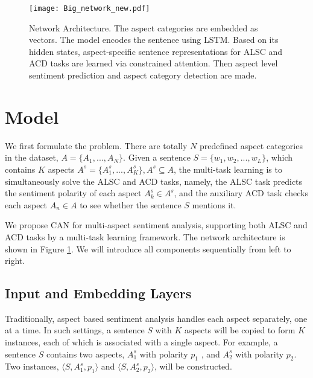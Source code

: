 \documentclass[11pt,a4paper]{article}
\begin{document}

\begin{figure*}
\setlength{\abovecaptionskip}{0.2cm}   %
\setlength{\belowcaptionskip}{-0.3cm}   %
\centering
	\texttt{[image: Big\_network\_new.pdf]}
    \caption{Network Architecture. The aspect categories are embedded as vectors. The model encodes the sentence using LSTM. Based on its hidden states, aspect-specific sentence representations for ALSC and ACD tasks are learned via constrained attention. Then aspect level sentiment prediction and aspect category detection are made. }
    \label{network}
\end{figure*}
\section{Model}
We first formulate the problem. There are totally $N$ predefined aspect categories in the dataset, $A=\{A_1,...,A_N\}$. Given a sentence $S=\{w_1, w_2, ..., w_L\}$, which contains $K$ aspects $A^s=\{A_1^s,...,A_K^s\}, A^s\subseteq  A$, the multi-task learning is to simultaneously solve the ALSC and ACD tasks, namely, the ALSC task predicts the sentiment polarity of each aspect $A_k^s \in A^s$, and the auxiliary ACD task checks each aspect $A_n \in A$ to see whether the sentence $S$ mentions it.

We propose CAN for multi-aspect sentiment analysis, supporting both ALSC and ACD tasks by a multi-task learning framework. The network architecture is shown in Figure \ref{network}. We will introduce all components sequentially from left to right.

\subsection{Input and Embedding Layers}
Traditionally, aspect based sentiment analysis handles each aspect separately, one at a time. In such settings, a sentence $S$ with $K$ aspects will be copied to form $K$ instances, each of which is associated with a single aspect. For example, a sentence $S$ contains two aspects, $A_1^s$ with polarity $p_1$ , and $A_2^s$ with polarity $p_2$. Two instances, $\langle{S, A_1^s, p_1}\rangle$ and $\langle{S, A_2^s, p_2}\rangle$, will be constructed.
\end{document}
